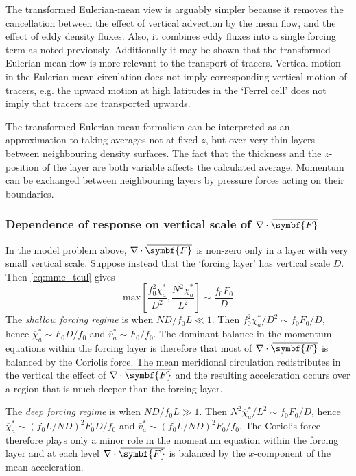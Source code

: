 \documentclass{jknotes}
\newcommand{\myol}[2][3]{{}\mkern#1mu\overline{\mkern-#1mu#2}}
\begin{document}
The transformed Eulerian-mean view is arguably simpler because it removes the
cancellation between the effect of vertical advection by the mean flow, and
the effect of eddy density fluxes. Also, it combines eddy fluxes into a single
forcing term as noted previously. Additionally it may be shown that the
transformed Eulerian-mean flow is more relevant to the transport of tracers.
Vertical motion in the Eulerian-mean circulation does not imply corresponding
vertical motion of tracers, e.g. the upward motion at high latitudes in the
`Ferrel cell' does not imply that tracers are transported upwards.

The transformed Eulerian-mean formalism can be interpreted as an approximation
to taking averages not at fixed $z$, but over very thin layers between
neighbouring density surfaces. The fact that the thickness and the
$z$-position of the layer are both variable affects the calculated average.
Momentum can be exchanged between neighbouring layers by pressure forces
acting on their boundaries.

\subsubsection{Dependence of response on vertical scale of $\nabla \cdot
\myol[4]{\symbf{F}}$}
In the model problem above, $\nabla \cdot \myol[4]{\symbf{F}}$ is non-zero only in
a layer with very small vertical scale. Suppose instead that the `forcing
layer' has vertical scale $D$. Then \eqref{eq:mmc_teul} gives
\begin{equation}
	\text{max} \left[ \frac{f_0^2 \overline{\chi}_a^*}{D^2}, \frac{N^2
	\overline{\chi}_a^*}{L^2}\right] \sim \frac{f_0 F_0}{D}
\end{equation}
The \emph{shallow forcing regime} is when $ND/f_0 L \ll 1$. Then $f_0^2
\overline{\chi}_a^* / D^2 \sim f_0 F_0/D$, hence $\overline{\chi}_a^* \sim F_0
D/f_0$ and $\overline{v}^*_a \sim F_0/f_0$. The dominant balance in the
momentum equations within the forcing layer is therefore that most of $\nabla
\cdot \myol[4]{\symbf{F}}$ is balanced by the Coriolis force. The mean meridional
circulation redistributes in the vertical the effect of $\nabla \cdot
\myol[4]{\symbf{F}}$ and the resulting acceleration occurs over a region that is
much deeper than the forcing layer. 

The \emph{deep forcing regime} is when $ND/f_0 L \gg 1$. Then $N^2
\overline{\chi}_a^*/L^2 \sim f_0 F_0/D$, hence $\overline{\chi}_a^* \sim (f_0
L/ND)^2 F_0 D/f_0$ and $\overline{v}_a^* \sim (f_0 L /ND)^2 F_0/f_0$. The
Coriolis force therefore plays only a minor role in the momentum equation
within the forcing layer and at each level $\nabla \cdot \myol[4]{\symbf{F}}$ is
balanced by the $x$-component of the mean acceleration.
\end{document}

